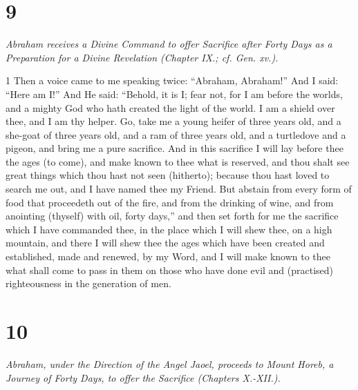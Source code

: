 \chapter{9}

\par \textit{Abraham receives a Divine Command to offer Sacrifice after Forty Days as a Preparation for a Divine Revelation (Chapter IX.; cf. Gen. xv.).}

\par 1 Then a voice came to me speaking twice: “Abraham, Abraham!” And I said: “Here am I!” And He said: “Behold, it is I; fear not, for I am before the worlds, and a mighty God who hath created the light of the world. I am a shield over thee, and I am thy helper. Go, take me a young heifer of three years old, and a she-goat of three years old, and a ram of three years old, and a turtledove and a pigeon, and bring me a pure sacrifice. And in this sacrifice I will lay before thee the ages (to come), and make known to thee what is reserved, and thou shalt see great things which thou hast not seen (hitherto); because thou hast loved to search me out, and I have named thee my Friend. But abstain from every form of food that proceedeth out of the fire, and from the drinking of wine, and from anointing (thyself) with oil, forty days,” and then set forth for me the sacrifice which I have commanded thee, in the place which I will shew thee, on a high mountain, and there I will shew thee the ages which have been created and established, made and renewed, by my Word, and I will make known to thee what shall come to pass in them on those who have done evil and (practised) righteousness in the generation of men.

\chapter{10}

\par \textit{Abraham, under the Direction of the Angel Jaoel, proceeds to Mount Horeb, a Journey of Forty Days, to offer the Sacrifice (Chapters X.-XII.).}

